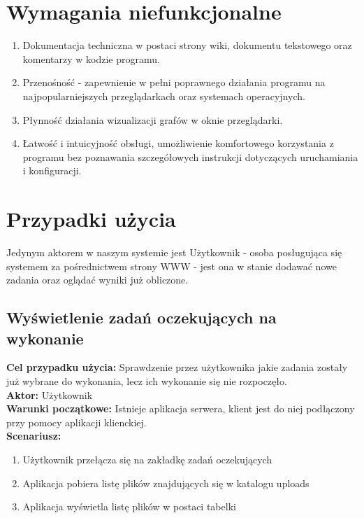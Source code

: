 \section{Wymagania niefunkcjonalne}

\begin{enumerate}
    \item Dokumentacja techniczna w postaci strony wiki, dokumentu tekstowego oraz komentarzy w kodzie programu.
    \item Przenośność - zapewnienie w pełni poprawnego działania programu na najpopularniejszych przeglądarkach oraz systemach operacyjnych.
    \item Płynność działania wizualizacji grafów w oknie przeglądarki.
    \item Łatwość i intuicyjność obsługi, umożliwienie komfortowego korzystania z programu bez poznawania szczegółowych instrukcji dotyczących uruchamiania i konfiguracji.
\end{enumerate}

\section{Przypadki użycia}

Jedynym aktorem w naszym systemie jest Użytkownik - osoba posługująca się systemem za pośrednictwem strony WWW - jest ona w stanie dodawać nowe zadania oraz oglądać wyniki już obliczone.\\

\subsection{Wyświetlenie zadań oczekujących na wykonanie}
	\textbf{Cel przypadku użycia:} Sprawdzenie przez użytkownika jakie zadania zostały już wybrane do wykonania, lecz ich wykonanie się nie rozpoczęło.\\
	\textbf{Aktor:} Użytkownik\\
	\textbf{Warunki początkowe:} Istnieje aplikacja serwera, klient jest do niej podłączony przy pomocy aplikacji klienckiej.\\
	\textbf{Scenariusz:}
	\begin{enumerate}
	\item Użytkownik przełącza się na zakładkę zadań oczekujących
	\item Aplikacja pobiera listę plików znajdujących się w katalogu uploads
	\item  Aplikacja wyświetla listę plików w postaci tabelki\\\\
	\end{enumerate}

